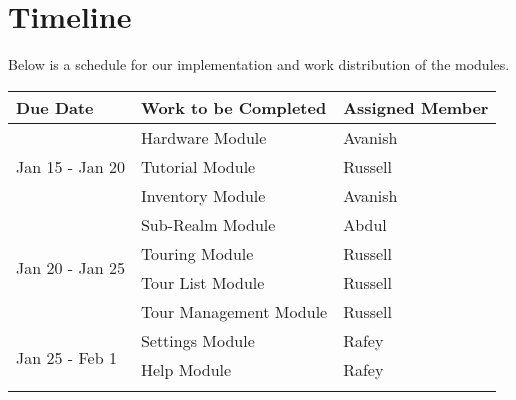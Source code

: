 \documentclass[12pt, titlepage]{article}
\begin{document}

\section{Timeline}
Below is a schedule for our implementation and work distribution of the modules.

\begin{table}[H]
\begin{tabular}{lll}
\hline
\multicolumn{1}{|l|}{\textbf{Due Date}}                & \multicolumn{1}{l|}{\textbf{Work to be Completed}}            & \multicolumn{1}{l|}{\textbf{Assigned Member}} \\ \hline
\multicolumn{1}{|l|}{\multirow{3}{*}{Jan 15 - Jan 20}} & \multicolumn{1}{l|}{Hardware Module}                          & \multicolumn{1}{l|}{Avanish}                  \\ \cline{2-3} 
\multicolumn{1}{|l|}{}                                 & \multicolumn{1}{l|}{Tutorial Module}                          & \multicolumn{1}{l|}{Russell}                  \\ \cline{2-3} 
\multicolumn{1}{|l|}{}                                 & \multicolumn{1}{l|}{Inventory Module}                         & \multicolumn{1}{l|}{Avanish}                  \\ \hline
\multicolumn{1}{|l|}{\multirow{4}{*}{Jan 20 - Jan 25}} & \multicolumn{1}{l|}{Sub-Realm Module}                         & \multicolumn{1}{l|}{Abdul}                    \\ \cline{2-3} 
\multicolumn{1}{|l|}{}                                 & \multicolumn{1}{l|}{Touring Module}                           & \multicolumn{1}{l|}{Russell}                  \\ \cline{2-3} 
\multicolumn{1}{|l|}{}                                 & \multicolumn{1}{l|}{Tour List Module}                         & \multicolumn{1}{l|}{Russell}                  \\ \cline{2-3} 
\multicolumn{1}{|l|}{}                                 & \multicolumn{1}{l|}{Tour Management Module}                   & \multicolumn{1}{l|}{Russell}                  \\ \hline
\multicolumn{1}{|l|}{\multirow{4}{*}{Jan 25 - Feb 1}}  & \multicolumn{1}{l|}{Settings Module}                          & \multicolumn{1}{l|}{Rafey}                    \\ \cline{2-3} 
\multicolumn{1}{|l|}{}                                 & \multicolumn{1}{l|}{Help Module}                              & \multicolumn{1}{l|}{Rafey}                    \\ \cline{2-3} 

\end{tabular}
\end{table}
\end{document}
